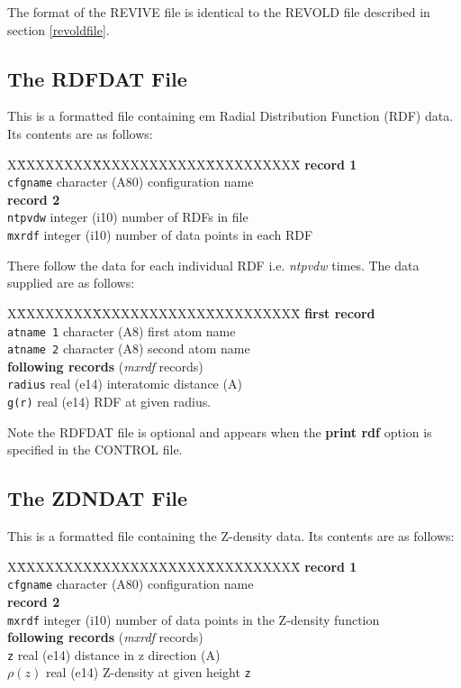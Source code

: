 The format of the REVIVE file is identical to the REVOLD file
described in section \ref{revoldfile}.

\subsection{The RDFDAT File}
\label{rdffile}

This is a formatted file containing {em Radial Distribution Function}
(RDF) data. Its contents are as follows:

\begin{tabbing}
X\=XXXXXXXX\=XXXXXXXXXXXX\=XXXXXXXXXX\=\kill
{\bf record 1}\\
\> {\tt cfgname} \> character (A80)\> configuration name\\
{\bf record 2}\\
\> {\tt ntpvdw} \> integer (i10) \> number of RDFs in file\\
\> {\tt mxrdf} \> integer (i10) \> number of data points in each RDF\\
\end{tabbing}

There follow the data for each individual RDF i.e. {\em ntpvdw}
times. The data supplied are as follows:

\begin{tabbing}
X\=XXXXXXXX\=XXXXXXXXXXXX\=XXXXXXXXXX\=\kill
{\bf first record}\\
\> {\tt atname 1} \> character (A8)\> first atom name\\
\> {\tt atname 2} \> character (A8)\> second atom name\\
{\bf following records} ({\em mxrdf} records)\\
\> {\tt radius} \> real (e14) \> interatomic distance (A)\\
\> {\tt g(r)} \> real (e14) \> RDF at given radius.\\
\end{tabbing}
Note the RDFDAT file is optional and appears when the {\bf print rdf}
option is specified in the CONTROL file.

\subsection{The ZDNDAT File}
\label{zdnfile}

This is a formatted file containing the Z-density data. Its contents
are as follows:

\begin{tabbing}
X\=XXXXXXXX\=XXXXXXXXXXXX\=XXXXXXXXXX\=\kill
{\bf record 1}\\
\> {\tt cfgname} \> character (A80)\> configuration name\\
{\bf record 2}\\
\> {\tt mxrdf} \> integer (i10) \> number of data points in the
Z-density function\\
{\bf following records} ({\em mxrdf} records)\\
\> {\tt z} \> real (e14) \> distance in z direction (A)\\
\> $\rho(z)$ \> real (e14) \> Z-density at given height {\tt z}\\
\end{tabbing}


